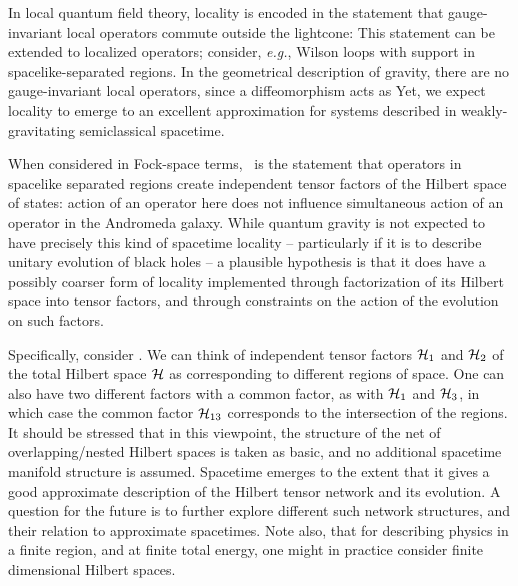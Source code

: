 In local quantum field theory, locality is encoded in the statement that gauge-invariant local operators commute outside the lightcone:
%
\eqn{}
%
This statement can be extended to localized operators; consider, {\it e.g.}, Wilson loops with support in spacelike-separated regions.  In the geometrical description of gravity, there are no gauge-invariant local operators, since a diffeomorphism acts as 
%
\eqn{}
%
Yet, we expect locality to emerge to an excellent approximation for systems described in weakly-gravitating semiclassical spacetime.

When considered in Fock-space terms, \commut\ is the statement that operators in spacelike separated regions create independent tensor factors of the Hilbert space of states: action of an operator here does not influence simultaneous action of an operator in the Andromeda galaxy.  While quantum gravity is not expected to have precisely this kind of spacetime locality -- particularly if it is to describe unitary evolution of black holes -- a plausible hypothesis is that it does have a possibly coarser form of locality implemented through factorization of its Hilbert space into tensor factors, and through constraints on the action of the evolution on such factors.


Specifically, consider \Tensfact.  We can think of independent tensor factors ${\cal H}_1$ and ${\cal H}_2$ of the total Hilbert space ${\cal H}$ as corresponding to different regions of space.  One can also have two different factors with a common factor, as with ${\cal H}_1$ and ${\cal H}_3$, in which case the common factor ${\cal H}_{13}$ corresponds to the intersection of the regions.  It should be stressed that in this viewpoint, the structure of the net of overlapping/nested Hilbert spaces is taken as basic, and no additional spacetime manifold structure is assumed.  Spacetime emerges to the extent that it gives a good approximate description of the Hilbert tensor network and its evolution.  A question for the future is to further explore different such network structures, and their relation to approximate spacetimes.  Note also, that for describing physics in a finite region, and at finite total energy, one might in practice consider finite dimensional Hilbert spaces.  

